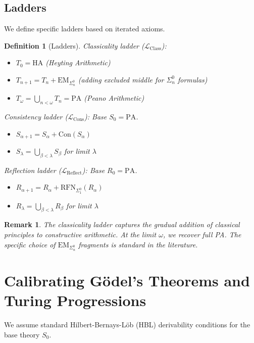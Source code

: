\documentclass[11pt]{article}
\newtheorem{definition}[theorem]{Definition}
\newtheorem{remark}[theorem]{Remark}
\newcommand{\PA}{\mathrm{PA}}
\newcommand{\HA}{\mathrm{HA}}
\newcommand{\Con}{\mathrm{Con}}
\newcommand{\RFNSigOne}{\mathrm{RFN}_{\Sigma^0_1}}
\newcommand{\LCons}{\mathcal{L}_{\mathrm{Cons}}}
\newcommand{\LReflect}{\mathcal{L}_{\mathrm{Reflect}}}
\newcommand{\LClass}{\mathcal{L}_{\mathrm{Class}}}
\newcommand{\EM}{\mathrm{EM}}
\begin{document}
\subsection{Ladders}
We define specific ladders based on iterated axioms.

\begin{definition}[Ladders]
\emph{Classicality ladder ($\LClass$):} 
\begin{itemize}
\item $T_0 = \HA$ (Heyting Arithmetic)
\item $T_{n+1} = T_n + \EM_{\Sigma^0_n}$ (adding excluded middle for $\Sigma^0_n$ formulas)
\item $T_\omega = \bigcup_{n<\omega} T_n = \PA$ (Peano Arithmetic)
\end{itemize}

\emph{Consistency ladder ($\LCons$):} Base $S_0=\PA$.
\begin{itemize}
\item $S_{\alpha+1} = S_\alpha + \Con(S_\alpha)$
\item $S_\lambda = \bigcup_{\beta<\lambda} S_\beta$ for limit $\lambda$
\end{itemize}

\emph{Reflection ladder ($\LReflect$):} Base $R_0=\PA$.
\begin{itemize}
\item $R_{\alpha+1} = R_\alpha + \RFNSigOne(R_\alpha)$
\item $R_\lambda = \bigcup_{\beta<\lambda} R_\beta$ for limit $\lambda$
\end{itemize}
\end{definition}

\begin{remark}
The classicality ladder captures the gradual addition of classical principles to constructive arithmetic. At the limit $\omega$, we recover full PA. The specific choice of $\EM_{\Sigma^0_n}$ fragments is standard in the literature.
\end{remark}

\section{Calibrating Gödel's Theorems and Turing Progressions}
We assume standard Hilbert-Bernays-Löb (HBL) derivability conditions for the base theory $S_0$.
\end{document}
